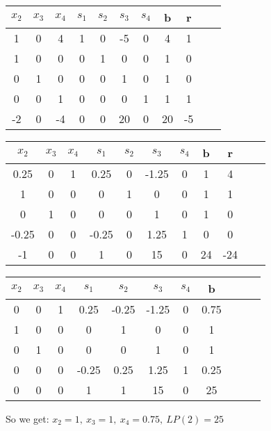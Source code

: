 \documentclass{article}
\begin{document}
\begin{center}
\begin{tabular}{|c|c|c|c|c|c|c|c|c|c|c|}
\hline
$x_2$ & $x_3$  & $x_4$ & $s_1$ & $s_2$ & $s_3$ & $s_4$ & b  & r \\ \hline
1\cellcolor{yellow!25}  & \cellcolor{yellow!25}0  & \cellcolor{pink!25}4  & \cellcolor{yellow!25}1  & \cellcolor{yellow!25}0  & \cellcolor{yellow!25}-5 & \cellcolor{yellow!25}0  & \cellcolor{yellow!25}4  & \cellcolor{yellow!25}1 \\ \hline
1  & 0  & \cellcolor{pink!25}0  & 0  & 1  & 0  & 0  & 1  & 0 \\ \hline
0  & 1  & \cellcolor{pink!25}0  & 0  & 0  & 1  & 0  & 1  & 0 \\ \hline
0  & 0  & \cellcolor{pink!25}1  & 0  & 0  & 0  & 1  & 1  & 1 \\ \hline
-2 & 0  & \cellcolor{pink!25}-4 & 0  & 0  & 20 & 0  & 20 & -5 \\ \hline
\end{tabular}
\end{center}

\begin{center}
\begin{tabular}{|c|c|c|c|c|c|c|c|c|c|c|}
\hline
$x_2$ & $x_3$  & $x_4$ & $s_1$ & $s_2$ & $s_3$ & $s_4$ & b  & r \\ \hline
\cellcolor{pink!25}0.25  & 0  & 1  & 0.25  & 0  & -1.25 & 0  & 1  & 4 \\ \hline
\cellcolor{pink!25}1     & \cellcolor{yellow!25}0  & \cellcolor{yellow!25}0  & \cellcolor{yellow!25}0     & \cellcolor{yellow!25}1  & \cellcolor{yellow!25}0     & \cellcolor{yellow!25}0  & \cellcolor{yellow!25}1  & \cellcolor{yellow!25}1 \\ \hline
\cellcolor{pink!25}0     & 1  & 0  & 0     & 0  & 1     & 0  & 1  & 0 \\ \hline
\cellcolor{pink!25}-0.25 & 0  & 0  & -0.25 & 0  & 1.25  & 1  & 0  & 0 \\ \hline
\cellcolor{pink!25}-1    & 0  & 0  & 1     & 0  & 15    & 0  & 24 & -24  \\ \hline
\end{tabular}
\end{center}

\begin{center}
\begin{tabular}{|c|c|c|c|c|c|c|c|c|c|c|}
\hline
$x_2$ & $x_3$  & $x_4$ & $s_1$ & $s_2$ & $s_3$ & $s_4$ & b  \\ \hline
0  & 0  & 1  & 0.25  & -0.25 & -1.25 & 0  & 0.75 \\ \hline
1  & 0  & 0  & 0     & 1     & 0     & 0  & 1    \\ \hline
0  & 1  & 0  & 0     & 0     & 1     & 0  & 1    \\ \hline
0  & 0  & 0  & -0.25 & 0.25  & 1.25  & 1  & 0.25 \\ \hline
0  & 0  & 0  & 1     & 1     & 15    & 0  & 25   \\ \hline
\end{tabular}
\end{center}
So we get: $x_2=1,\: x_3=1, \: x_4=0.75,\: LP(2)=25$
\\
\end{document}
